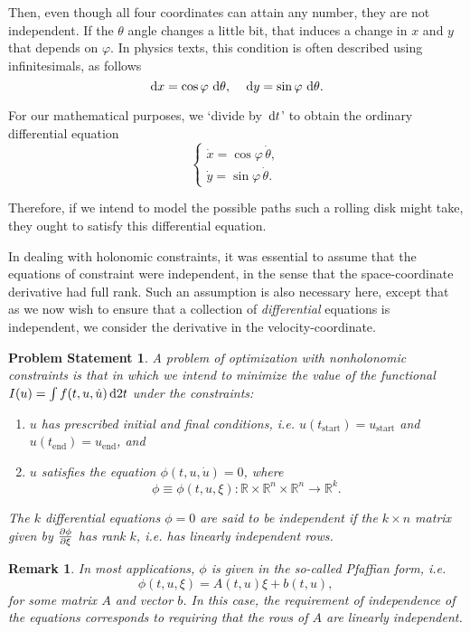 \documentclass{article}
\theoremstyle{plain}
\newtheorem{remark}{Remark}
\theoremstyle{nonumberplain}
\newtheorem{statement}{Problem Statement}
\newcommand{\R}{\mathbb{R}}
\newcommand{\tstart}{\mathrm{start}}
\newcommand{\tend}{\mathrm{end}}
\begin{document}
Then, even though all four coordinates can attain any number, they are not independent. If the $\theta$ angle changes a little bit, that induces a change in $x$ and $y$ that depends on $\varphi$. In physics texts, this condition is often described using infinitesimals, as follows
\[\dl x = \cos \varphi \, \dl \theta, \quad \dl y = \sin \varphi \, \dl \theta.\]

For our mathematical purposes, we `divide by $\dl t$' to obtain the ordinary differential equation
\[
\begin{cases}
\dot x = \cos \varphi \, \dot \theta,\\
\dot y = \sin \varphi \, \dot \theta.
\end{cases}
\]

Therefore, if we intend to model the possible paths such a rolling disk might take, they ought to satisfy this differential equation.

In dealing with holonomic constraints, it was essential to assume that the equations of constraint were independent, in the sense that the space-coordinate derivative had full rank. Such an assumption is also necessary here, except that  as we now wish to ensure that a collection of \emph{differential} equations is independent, we consider the derivative in the velocity-coordinate.

\begin{statement}
A problem of optimization with nonholonomic constraints is that in which we intend to minimize the value of the functional $I(u) = \int f(t, u, \dot u) \dl2 t$ under the constraints:
\begin{enumerate}
\item $u$ has prescribed initial and final conditions, i.e. $u(t_\tstart) = u_\tstart$ and $u(t_\tend) = u_\tend$, and
\item $u$ satisfies the equation $\phi(t,u,\dot u) = 0$, where
\[\phi \equiv \phi(t, u, \xi) \colon \R \times \R^n \times \R^n \to \R^k.\]
\end{enumerate}

The $k$ differential equations $\phi = 0$ are said to be \emph{independent} if the $k \times n$ matrix given by $\diffp \phi \xi$ has rank $k$, i.e. has linearly independent rows.
\end{statement}

\begin{remark}\label{pfaffian}
In most applications, $\phi$ is given in the so-called Pfaffian form, i.e.
\[\phi(t,u,\xi) = A(t,u) \xi + b(t,u),\]
for some matrix $A$ and vector $b$. In this case, the requirement of independence of the equations corresponds to requiring that the rows of $A$ are linearly independent.
\end{remark}
\end{document}
